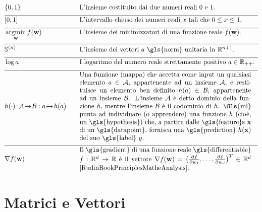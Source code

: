 \newpage
\begin{align}
		&\{0,1\}& \quad & \mbox{L'insieme costituito dai due numeri reali $0$ e $1$.} \nonumber \\[2mm] \hline \nonumber\\[-5mm]
	&[0,1] &\quad &\mbox{L'intervallo chiuso dei numeri reali $x$ tali che $0 \leq x \leq 1$. }\nonumber \\[2mm] \hline \nonumber\\[-5mm]
    &\argmin_{\weights} f(\weights) &\quad &\mbox{L'insieme dei minimizzatori di una funzione reale $f(\weights)$.  } \nonumber \\[2mm] \hline \nonumber\\[-5mm]
    &\sphere{\nrnodes} &\quad &\mbox{L'insieme dei vettori a \gls{norm} unitaria in $\mathbb{R}^{\nrnodes+1}$.  }\nonumber \\[2mm] \hline \nonumber\\[-5mm]
	 &\log a &\quad &\mbox{I logaritmo del numero reale strettamente positivo $a \in \mathbb{R}_{++}$.  } \nonumber \\[2mm] \hline \nonumber\\[-5mm]
	 &\hypothesis(\cdot)\!:\!\mathcal{A}\!\rightarrow\!\mathcal{B} :  a \!\mapsto\!h(a) &\quad &\parbox{.75\textwidth}{
	 	Una funzione (mappa) che accetta come input un qualsiasi elemento $a \in \mathcal{A}$, appartenente ad un insieme $\mathcal{A}$, e restituisce un elemento ben definito $h(a) \in \mathcal{B}$, appartenente ad un insieme $\mathcal{B}$. 
	 	L'insieme $\mathcal{A}$ è detto dominio della funzione $h$, mentre l'insieme $\mathcal{B}$ è il codominio di $\hypothesis$. \Gls{ml} punta ad individuare (o apprendere) una funzione $\hypothesis$ (cioè, un \gls{hypothesis}) che, a partire dalle \gls{feature}s $\featurevec$ di un \gls{datapoint}, fornisca una \gls{prediction} $\hypothesis(\featurevec)$
	 	del suo \gls{label} $\truelabel$.} \nonumber \\[2mm] \hline \nonumber\\[-5mm]
	 	&\nabla f(\weights) & \quad & \parbox{.75\textwidth}{Il \gls{gradient} di una funzione reale \gls{differentiable}
	 	$f: \mathbb{R}^{\featuredim}\rightarrow \mathbb{R}$ è il vettore
	 	$\nabla f(\weights) = \big( \frac{\partial f}{\partial \weight_{1}},\ldots,\frac{\partial f}{\partial \weight_{\featuredim}}  \big)^{T} \in \mathbb{R}^{\featuredim}$ \cite[Ch. 9]{RudinBookPrinciplesMatheAnalysis}.}   \nonumber
\end{align} 
\section*{Matrici e Vettori} 

